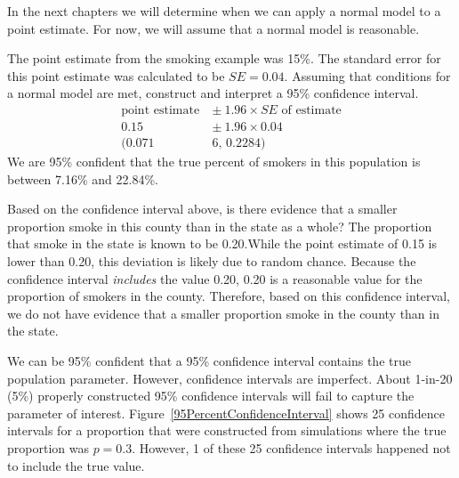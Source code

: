 In the next chapters we will determine when we can apply a normal model to a point estimate. For now, we will assume that a normal model is reasonable. 

\begin{examplewrap}
\begin{nexample}{The point estimate from the smoking example was 15\%. The standard error for this point estimate was calculated to be $SE = 0.04$. Assuming that conditions for a normal model are met, construct and interpret a 95\% confidence interval.  }
\textA{\vspace{-6mm}}
\begin{align*}
\text{point estimate}\ &\pm \ 1.96\times SE \text{ of estimate} \\
0.15\  &\pm \ 1.96\times 0.04\\
(0.071&6\text{, } 0.2284)
\end{align*}
We are 95\% confident that the true percent of smokers in this population is between 7.16\% and 22.84\%.
\end{nexample}
\end{examplewrap}

\begin{examplewrap}
\begin{nexample}{Based on the confidence interval above, is there evidence that a smaller proportion smoke in this county than in the state as a whole? The proportion that smoke in the state is known to be 0.20.}While the point estimate of 0.15 is lower than 0.20, this deviation is likely due to random chance. Because the confidence interval \emph{includes} the value 0.20, 0.20 is a reasonable value for the proportion of smokers in the county. Therefore, based on this confidence interval, we do not have evidence that a smaller proportion smoke in the county than in the state.
\end{nexample}
\end{examplewrap}

We can be 95\% confident that a 95\% confidence interval contains the true population parameter. However, confidence intervals are imperfect. About 1-in-20 (5\%) properly constructed 95\% confidence intervals will fail to capture the parameter of interest. Figure~\ref{95PercentConfidenceInterval} shows 25 confidence intervals for a proportion that were constructed from simulations where the true proportion was $p = 0.3$. However, 1 of these 25 confidence intervals happened not to include the true value.


